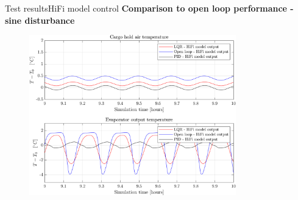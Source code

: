 \begin{frame}{Test results}{HiFi model control}
	\textbf{Comparison to open loop performance - sine disturbance}
	\begin{figure}[H]
		\centering
		\includegraphics[width=0.8\textwidth]{../Graphics/fig_LQRvsKresten_sineDist_OL_zoom.png}
	\end{figure} 
\end{frame}




